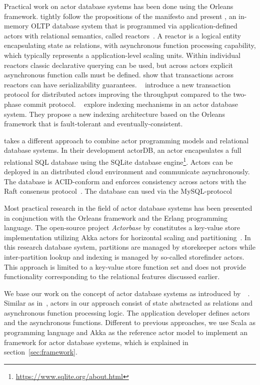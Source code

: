   Practical work on actor database systems has been done using the Orleans framework.
  \citeauthor{Shah:reactdb} tightly follow the propositions of the manifesto and present \reactdb{},
  an in-memory OLTP database system that is programmed via application-defined actors with relational semantics, called reactors~\cite{Shah:reactdb}.
  A reactor is a logical entity encapsulating state as relations, with
  asynchronous function processing capability, which typically represents a application-level scaling units.
  Within individual reactors classic declarative querying can be used, but across actors explicit asynchronous function calls must be defined.
  \citeauthor{Shah:reactdb} show that transactions across reactors can have serializability guarantees.
  \citeauthor{Eldeeb:transactions}~\cite{Eldeeb:transactions} introduce a new transaction protocol for distributed actors improving the throughput compared to the two-phase commit protocol.
  \citeauthor{Bernstein:indexing}~\cite{Bernstein:indexing} explore indexing mechanisms in an actor database system.
  They propose a new indexing architecture based on the Orleans framework that is fault-tolerant and eventually-consistent.

  \citeauthor{biokoda:actordb} takes a different approach to combine actor programming models and relational database systems.
  In their development actorDB, an actor encapsulates a full relational SQL database using the SQLite database engine\footnote{\url{https://www.sqlite.org/about.html}}.
  Actors can be deployed in an distributed cloud environment and communicate asynchronously.
  The database is ACID-conform and enforces consistency across actors with the Raft consensus protocol~\cite{raft}.
  The database can used via the MySQL-protocol

  Most practical research in the field of actor database systems has been presented in conjunction with the Orleans framework and the Erlang programming language.
  The open-source project \textit{Actorbase} by \citeauthor{actorbase} constitutes a key-value store implementation utilizing Akka actors for horizontal scaling and partitioning~\cite{actorbase}.
  In this research database system, partitions are managed by storekeeper actors while inter-partition lookup and indexing is managed by so-called storefinder actors.
  This approach is limited to a key-value store function set and does not provide functionality corresponding to the relational features discussed earlier.
  
  We base our work on the concept of actor database systems as introduced by~\citeauthor{manifesto}~\cite{manifesto}.
  Similar as in~\cite{Shah:reactdb}, actors in our approach consist of state abstracted as relations and asynchronous function processing logic.
  The application developer defines actors and the asynchronous functions.
  Different to previous approaches, we use Scala as programming language and Akka as the reference actor model to implement an framework for actor database systems, which is explained in section~\ref{sec:framework}.